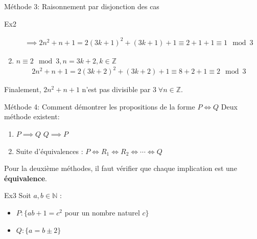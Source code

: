 \begin{parag}{Méthode 3: Raisonnement par disjonction des cas}
\begin{subparag}{Ex2}
\begin{enumerate}
            \begin{align*}
                \implies 2n^2 + n + 1 = 2(3k + 1) ^2 + (3k + 1) + 1 \equiv 2 + 1 + 1 \equiv 1 \mod 3
            \end{align*}
            \item $n \equiv 2 \mod 3, n = 3k + 2, k \in \mathbb{Z}$
            \begin{align*}
                2n^2 + n + 1 = 2(3k + 2)^2 + (3k + 2) + 1\equiv  8 + 2 + 1 \equiv 2 \mod3
            \end{align*}
        \end{enumerate}
        Finalement, $2n^2 + n + 1$ n'est pas divisible par $3 \; \forall n  \in \mathbb{Z}$.
    \end{subparag}
\end{parag}
\begin{parag}{Méthode 4: Comment démontrer les propositions de la forme $P \iff Q$}
    Deux méthode existent:
    \begin{enumerate}
        \item $P \implies Q$  $Q \implies P$
        \item Suite d'équivalences : $P \iff R_1 \iff R_2 \iff \cdots \iff Q$
    \end{enumerate}
    \begin{framedremark}
        Pour la deuxième méthodes, il faut vérifier que chaque implication est une \textbf{équivalence}.
    \end{framedremark}
    \begin{subparag}{Ex3}
        Soit $a, b \in \mathbb{N}$ : 
        \begin{itemize}
            \item $P : \{ ab + 1 = c^2$ pour un nombre naturel $c \}$
            \item $Q: \{a = b \pm 2\}$
            

\end{itemize}
\end{subparag}
\end{parag}
